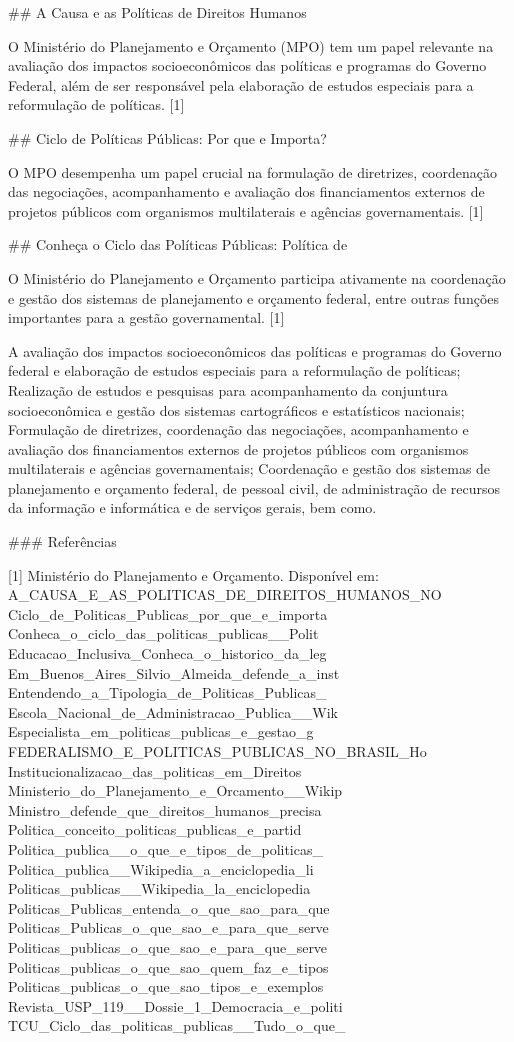 \documentclass[
   article,       
   12pt,          
   oneside,       
   a4paper,       
   english,       
   brazil,        
   sumario=tradicional
   ]{abntex2}
\begin{document}
## A Causa e as Políticas de Direitos Humanos

O Ministério do Planejamento e Orçamento (MPO) tem um papel relevante na avaliação dos impactos socioeconômicos das políticas e programas do Governo Federal, além de ser responsável pela elaboração de estudos especiais para a reformulação de políticas. [1]

## Ciclo de Políticas Públicas: Por que e Importa?

O MPO desempenha um papel crucial na formulação de diretrizes, coordenação das negociações, acompanhamento e avaliação dos financiamentos externos de projetos públicos com organismos multilaterais e agências governamentais. [1]

## Conheça o Ciclo das Políticas Públicas: Política de

O Ministério do Planejamento e Orçamento participa ativamente na coordenação e gestão dos sistemas de planejamento e orçamento federal, entre outras funções importantes para a gestão governamental. [1]

A avaliação dos impactos socioeconômicos das políticas e programas do Governo federal e elaboração de estudos especiais para a reformulação de políticas; Realização de estudos e pesquisas para acompanhamento da conjuntura socioeconômica e gestão dos sistemas cartográficos e estatísticos nacionais; Formulação de diretrizes, coordenação das negociações, acompanhamento e avaliação dos financiamentos externos de projetos públicos com organismos multilaterais e agências governamentais; Coordenação e gestão dos sistemas de planejamento e orçamento federal, de pessoal civil, de administração de recursos da informação e informática e de serviços gerais, bem como.

### Referências

[1] Ministério do Planejamento e Orçamento. Disponível em: A_CAUSA_E_AS_POLITICAS_DE_DIREITOS_HUMANOS_NO Ciclo_de_Politicas_Publicas_por_que_e_importa Conheca_o_ciclo_das_politicas_publicas__Polit Educacao_Inclusiva_Conheca_o_historico_da_leg Em_Buenos_Aires_Silvio_Almeida_defende_a_inst Entendendo_a_Tipologia_de_Politicas_Publicas_ Escola_Nacional_de_Administracao_Publica__Wik Especialista_em_politicas_publicas_e_gestao_g FEDERALISMO_E_POLITICAS_PUBLICAS_NO_BRASIL_Ho Institucionalizacao_das_politicas_em_Direitos Ministerio_do_Planejamento_e_Orcamento__Wikip Ministro_defende_que_direitos_humanos_precisa Politica_conceito_politicas_publicas_e_partid Politica_publica__o_que_e_tipos_de_politicas_ Politica_publica__Wikipedia_a_enciclopedia_li Politicas_publicas__Wikipedia_la_enciclopedia Politicas_Publicas_entenda_o_que_sao_para_que Politicas_Publicas_o_que_sao_e_para_que_serve Politicas_publicas_o_que_sao_e_para_que_serve Politicas_publicas_o_que_sao_quem_faz_e_tipos Politicas_publicas_o_que_sao_tipos_e_exemplos Revista_USP_119__Dossie_1_Democracia_e_politi TCU_Ciclo_das_politicas_publicas__Tudo_o_que_
\end{document}
